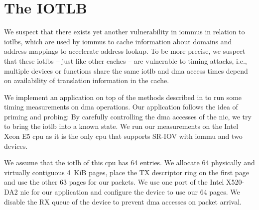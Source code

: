 \section{The IOTLB}
\label{sec:iotlb}

We suspect that there exists yet another vulnerability in \acp{iommu} in
relation to \acp{iotlb}, which are used by \acp{iommu} to cache information
about domains and address mappings to accelerate address lookup. To be more
precise, we suspect that these \acp{iotlb} -- just like other caches -- are
vulnerable to timing attacks, i.e., multiple devices or functions share the same
\ac{iotlb} and \ac{dma} access times depend on availability of translation
information in the cache.

We implement an application on top of the methods described in
 to run some timing measurements on \ac{dma} operations.
Our application follows the idea of priming and probing: By carefully
controlling the \ac{dma} accesses of the \ac{nic}, we try to bring the
\ac{iotlb} into a known state. We run our measurements on the Intel Xeon E5
\ac{cpu} as it is the only \ac{cpu} that supports SR-IOV with \ac{iommu} and two
devices.

We assume that the \ac{iotlb} of this \ac{cpu} has 64 entries. We allocate 64
physically and virtually contiguous 4~KiB pages, place the TX descriptor ring on
the first page and use the other 63 pages for our packets. We use one port of
the Intel X520-DA2 \ac{nic} for our application and configure the device to use
our 64 pages. We disable the RX queue of the device to prevent \ac{dma} accesses
on packet arrival.

